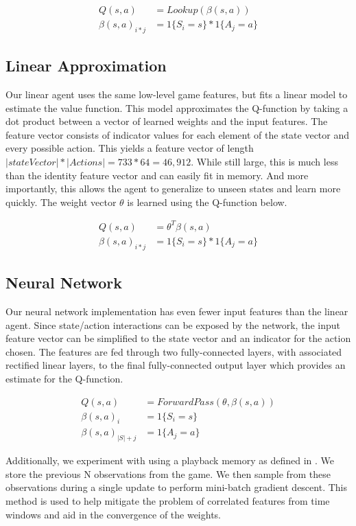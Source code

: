\documentclass[12pt]{article}
\begin{document}
\begin{align*}
Q(s,a) &= Lookup(\beta(s,a))\\
\beta(s,a)_{i*j} &= 1\{ S_i = s \} * 1\{ A_j = a \}
\end{align*}

\subsection{Linear Approximation}

Our linear agent uses the same low-level game features, but fits a linear model to estimate the value function. This model approximates the Q-function by taking a dot product between a vector of learned weights and the input features. The feature vector consists of indicator values for each element of the state vector and every possible action. This yields a feature vector of length $|stateVector| * |Actions| = 733 * 64 = 46,912$. While still large, this is much less than the identity feature vector and can easily fit in memory. And more importantly, this allows the agent to generalize to unseen states and learn more quickly. The weight vector $\theta$ is learned using the Q-function below.

\begin{align*}
Q(s,a) &= \theta^T \beta(s,a)\\
\beta(s,a)_{i*j} &= 1\{ S_i = s \} * 1\{ A_j = a \}
\end{align*}

\subsection{Neural Network}

Our neural network implementation has even fewer input features than the linear agent. Since state/action interactions can be exposed by the network, the input feature vector can be simplified to the state vector and an indicator for the action chosen. The features are fed through two fully-connected layers, with associated rectified linear layers, to the final fully-connected output layer which provides an estimate for the Q-function.

\begin{align*}
Q(s,a) &= ForwardPass(\theta, \beta(s, a))\\
\beta(s,a)_{i} &= 1 \{ S_i = s \}\\
\beta(s,a)_{|S| + j} &= 1 \{ A_j = a \}
\end{align*}

Additionally, we experiment with using a playback memory as defined in \cite{mnih2013playing}. We store the previous N observations from the game. We then sample from these observations during a single update to perform mini-batch gradient descent. This method is used to help mitigate the problem of correlated features from time windows and aid in the convergence of the weights.
\end{document}
